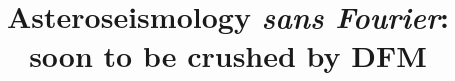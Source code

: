 \documentclass[modern]{aastex61}
\begin{document}
\title{Asteroseismology {\it sans Fourier}: soon to be crushed by DFM}


\end{document}
